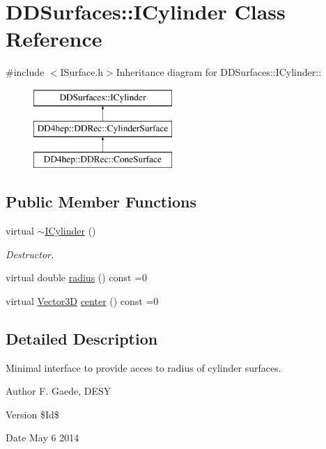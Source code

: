 \hypertarget{class_d_d_surfaces_1_1_i_cylinder}{
\section{DDSurfaces::ICylinder Class Reference}
\label{class_d_d_surfaces_1_1_i_cylinder}
}


{\ttfamily \#include $<$ISurface.h$>$}Inheritance diagram for DDSurfaces::ICylinder::\begin{figure}[H]
\begin{center}
\leavevmode
\includegraphics[height=3cm]{class_d_d_surfaces_1_1_i_cylinder}
\end{center}
\end{figure}
\subsection*{Public Member Functions}
\begin{DoxyCompactItemize}
\item 
virtual \hyperlink{class_d_d_surfaces_1_1_i_cylinder_a8b9d98560a1241956335604eb3c51c16}{$\sim$ICylinder} ()
\begin{DoxyCompactList}\small\item\em Destructor. \item\end{DoxyCompactList}\item 
virtual double \hyperlink{class_d_d_surfaces_1_1_i_cylinder_a66bc9b90cdb121938eff646b2fd21385}{radius} () const =0
\item 
virtual \hyperlink{class_d_d_surfaces_1_1_vector3_d}{Vector3D} \hyperlink{class_d_d_surfaces_1_1_i_cylinder_acebccc0b84cc5b7e53bb2e56fb991f16}{center} () const =0
\end{DoxyCompactItemize}


\subsection{Detailed Description}
Minimal interface to provide acces to radius of cylinder surfaces. \begin{DoxyAuthor}{Author}
F. Gaede, DESY 
\end{DoxyAuthor}
\begin{DoxyVersion}{Version}
\$Id\$ 
\end{DoxyVersion}
\begin{DoxyDate}{Date}
May 6 2014 
\end{DoxyDate}


